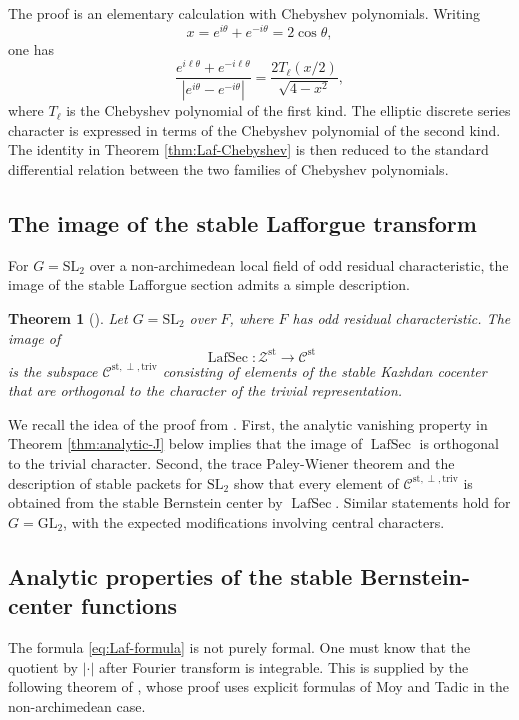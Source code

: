 \documentclass[iccmp]{ipbook}
\newcommand{\CC}{{\mathcal {C}}}
\newcommand{\CZ}{{\mathcal {Z}}}
\newcommand{\GL}{{\mathrm{GL}}}
\newcommand{\SL}{{\mathrm{SL}}}
\newcommand{\st}{{\mathrm{st}}}
\newcommand{\LafSec}{\operatorname{LafSec}}
\newcommand{\triv}{\mathrm{triv}}
\newtheorem{thm}{Theorem}[subsection]
\begin{document}
The proof is an elementary calculation with Chebyshev polynomials. Writing
\[
x=e^{i\theta}+e^{-i\theta}=2\cos\theta,
\]
one has
\[
\frac{e^{i\ell\theta}+e^{-i\ell\theta}}{|e^{i\theta}-e^{-i\theta}|}
=
\frac{2T_\ell(x/2)}{\sqrt{4-x^2}},
\]
where $T_\ell$ is the Chebyshev polynomial of the first kind. The elliptic discrete series
character is expressed in terms of the Chebyshev polynomial of the second kind. The identity
in Theorem \ref{thm:Laf-Chebyshev} is then reduced to the standard differential relation
between the two families of Chebyshev polynomials.

\subsection{The image of the stable Lafforgue transform}\label{subsec:image-stable-Laf}

For $G=\SL_2$ over a non-archimedean local field of odd residual characteristic, the image
of the stable Lafforgue section admits a simple description.

\begin{thm}[{\cite[Thm.~5.4.1]{LN}}]\label{thm:image-stable-Laf}
Let $G=\SL_2$ over $F$, where $F$ has odd residual characteristic. The image of
\[
\LafSec:\CZ^{\st}\to \CC^{\st}
\]
is the subspace $\CC^{\st,\perp,\triv}$ consisting of elements of the stable Kazhdan cocenter
that are orthogonal to the character of the trivial representation.
\end{thm}

We recall the idea of the proof from \cite[\S 5.4]{LN}. First, the analytic vanishing
property in Theorem \ref{thm:analytic-J} below implies that the image of $\LafSec$ is
orthogonal to the trivial character. Second, the trace Paley-Wiener theorem and the
description of stable packets for $\SL_2$ show that every element of
$\CC^{\st,\perp,\triv}$ is obtained from the stable Bernstein center by $\LafSec$. Similar
statements hold for $G=\GL_2$, with the expected modifications involving central characters.

\subsection{Analytic properties of the stable Bernstein-center functions}
\label{subsec:analytic-J}

The formula \eqref{eq:Laf-formula} is not purely formal. One must know that the quotient
by $|\cdot|$ after Fourier transform is integrable. This is supplied by the following theorem
of \cite[\S 5.5]{LN}, whose proof uses explicit formulas of Moy and Tadic in the
non-archimedean case.
\end{document}
